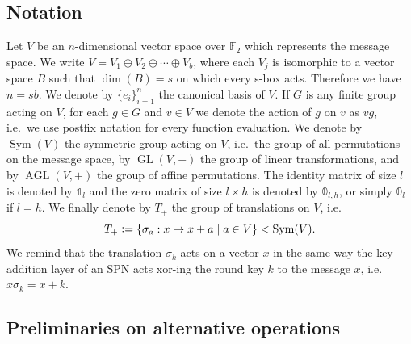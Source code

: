 \documentclass[runningheads,a4paper,english]{llncs}
\newcommand{\F}{\mathbb{F}}
\newcommand{\one}{\mathbb{1}}
\newcommand{\zero}{\mathbb{0}}
\newcommand{\sg}{\sigma}
\DeclareMathOperator{\GL}{GL}
\DeclareMathOperator{\AGL}{AGL}
\DeclareMathOperator{\sym}{Sym}
\newcommand{\defeq}{\vcentcolon=}
\begin{document}
\subsection{Notation}
Let $V$ be an $n$-dimensional vector space over $\F_2$ which represents the message space. We write $V = V_1 \oplus V_2 \oplus \cdots \oplus V_b$, where each $V_j$ is isomorphic to a vector space $B$ such that $\dim(B) = s$ on which every s-box acts. Therefore we have $n=sb$. We denote by $\{e_i\}_{i=1}^n$ the canonical basis of $V$.
If $G$ is any finite group acting on $V$, for each $g \in G$ and $v \in V$ we denote the action of $g$ on $v$ as $vg$, i.e.\ we use postfix notation for every function evaluation. We denote by $\sym(V)$ the symmetric group acting on $V$, i.e.\ the group of all permutations on the message space, by $\GL(V,+)$ the group of linear transformations, and by $\AGL(V,+)$ the group of affine permutations.  
The identity matrix of size $l$ is denoted by $\one_l$ and the zero matrix of size $l \times h$ is denoted by $\zero_{l,h}$, or simply $\zero_l$ if $l=h$. 
We finally denote by $T_+$ the group of translations on $V$, i.e. \[T_+ \defeq \{ \sg_a:  x \mapsto x+a \mid a \in V\} < \sym(V).\] We remind that the translation $\sg_k$ acts on a vector $x$ in the same way the key-addition layer of an SPN acts xor-ing the round key $k$ to the message $x$, i.e. $x\sg_k = x + k$.   

\subsection{Preliminaries on alternative operations}
\label{sec:alt_op}
\end{document}

